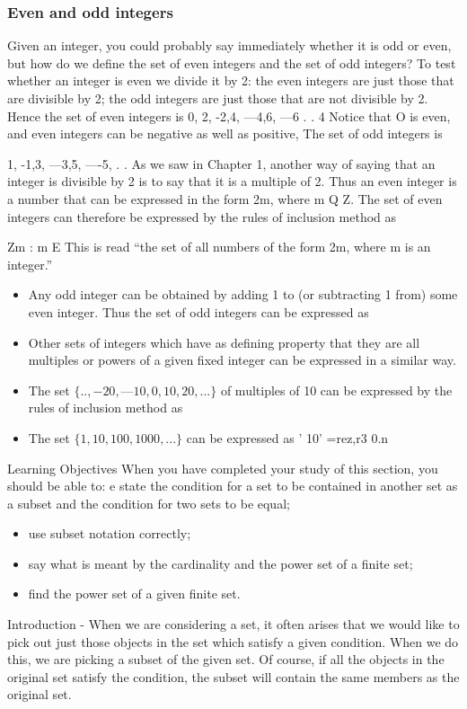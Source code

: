 {\smallskip 
\frametitle{Even and odd integers}
Given an integer, you could probably say immediately whether it is odd or even, but how do we
deﬁne the set of even integers and the set of odd integers? To test whether an integer is even we
divide it by 2: the even integers are just those that are divisible by 2; the odd integers are just
those that are not divisible by 2. Hence the set of even integers is
{0, 2, -2,4, —4,6, —6 . . 4}
\smallskip 
\smallskip 
Notice that O is even, and even integers can be negative as well as positive, The set of odd integers
is
{1, -1,3, —3,5, —-5, . . 
As we saw in Chapter 1, another way of saying that an integer is divisible by 2 is to say that it is
a multiple of 2. Thus an even integer is a number that can be expressed in the form 2m, where
m Q Z. The set of even integers can therefore be expressed by the rules of inclusion method as
{Zm : m E 
This is read
“the set of all numbers of the form 2m, where m is an integer.”
\smallskip 
\smallskip 
\begin{itemize}
\item Any odd integer can be obtained by adding 1 to (or subtracting 1 from) some even integer. Thus
the set of odd integers can be expressed as
\item Other sets of integers which have as deﬁning property that they are all multiples or powers of a
given ﬁxed integer can be expressed in a similar way.
\end{itemize}

\smallskip 
\smallskip 
\begin{itemize}
\item The set $\{.. ,-20,—10,0,10,20,...\}$ of multiples of 10 can be expressed by the rules
of inclusion method as
\item The set $\{1,10,100,1000,...\}$ can be expressed as ’
{10' =rez,r3 0}.n
\end{itemize}
\smallskip 
\smallskip 

Learning Objectives
When you have completed your study of this section, you should be able to:
e state the condition for a set to be contained in another set as a subset and the condition for
two sets to be equal; 
\begin{itemize}
\item use subset notation correctly;
\item  say what is meant by the cardinality and the power set of a finite set;
\item  ﬁnd the power set of a given ﬁnite set.
\end{itemize}
\smallskip 
\smallskip 
Introduction -
When we are considering a set, it often arises that we would like to pick out just those objects in
the set which satisfy a given condition. When we do this, we are picking a subset of the given set.
Of course, if all the objects in the original set satisfy the condition, the subset will contain the
same members as the original set. 

}}}
